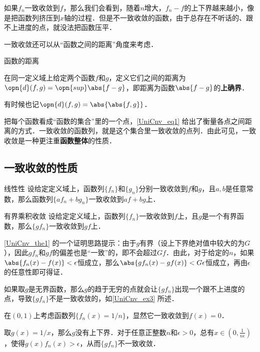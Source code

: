 如果$f_n$一致收敛到$f$，那么我们会看到，随着$n$增大，$f_n-f$的上下界越来越小，像是把函数列挤压到$x$轴的过程．但是不一致收敛的函数，由于总存在不听话的、跟不上进度的点，就没法把函数压平．

一致收敛还可以从“函数之间的距离”角度来考虑．

\begin{definition}{函数的距离}\label{UniCnv_def1}

在同一定义域上给定两个函数$f$和$g$，定义它们之间的距离为$\opn{d}(f, g)=\opn{sup}\abs{f-g}$，即距离为函数$\abs{f-g}$的\textbf{上确界}．

有时候也记$\opn{d}(f, g)=\abs{\abs{f, g}}$．

\end{definition}

把每个函数看成“函数的集合”里的一个点，\autoref{UniCnv_eq1} 给出了衡量各点之间距离的方式．一致收敛的函数列，就是这个集合里一致收敛的点列．由此可见，一致收敛是一种更注重\textbf{函数整体}的性质．


\subsection{一致收敛的性质}

\begin{theorem}{线性性}
设给定定义域上，函数列$\{f_n\}$和$\{g_n\}$分别一致收敛到$f$和$g$，且$a, b$是任意常数，那么函数列$\{af_n+bg_n\}$一致收敛到$af+bg$上．
\end{theorem}

\begin{theorem}{有界乘积收敛}\label{UniCnv_the1}
设给定定义域上，函数列$\{f_n\}$一致收敛到$f$上，且$g$是一个有界函数，那么$\{gf_n\}$一致收敛到$gf$上．
\end{theorem}

\autoref{UniCnv_the1} 的一个证明思路提示：由于$g$有界（设上下界绝对值中较大的为$G$），因此$gf_n$和$gf$的偏差也是“一致”的，即不会超过$Gf$．由此，对于给定的$n$，如果$\abs{f_n(x)-f(x)}<\epsilon$恒成立，那么$\abs{gf_n(x)-gf(x)}<G\epsilon$恒成立，再由$\epsilon$的任意性即可得证．

如果取$g$是无界函数，那么$g$的趋于无穷的点就会让$\{gf_n\}$出现一个跟不上进度的点，导致$\{gf_n\}$不是一致收敛的，如\autoref{UniCnv_ex3} 所述．

\begin{example}{}\label{UniCnv_ex3}
在$(0, 1)$上考虑函数列$\{f_n(x)=1/n\}$，显然它一致收敛到$f(x)=0$．

取$g(x)=1/x$，那么$g$没有上下界．对于任意正整数$n$和$\epsilon>0$，总有$x\in(0, \frac{1}{n\epsilon})$，使得$g(x)f_n(x)>\epsilon$，从而$\{gf_n\}$不一致收敛．
\end{example}

